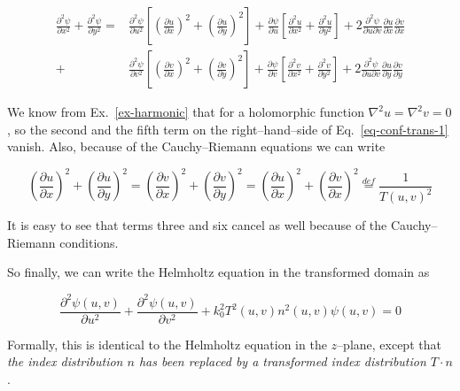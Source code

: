 \begin{sidebar}
\begin{align}
\frac{\partial^2 \psi}{\partial x^2} + \frac{\partial^2 \psi}{\partial y^2}=& 
\frac{\partial^2 \psi}{\partial u^2 }  \left [ \left(\frac{\partial u}{\partial
x}\right)^2 
+ \left(\frac{\partial u}{\partial y}\right)^2\right]+ \frac{\partial
\psi}{\partial u} \left[ \frac{\partial^2 u}{\partial x^2} 
+ \frac{\partial^2 u}{\partial y^2} \right] 
+ 2\frac{\partial^2 \psi}{\partial u \partial v} \frac{\partial u}{\partial x}
\frac{\partial v}{\partial x}    \nonumber \\  
+& \frac{\partial^2 \psi}{\partial v^2}  \left[ \left(\frac{\partial v}{\partial
x}\right)^2  
+ \left(\frac{\partial v}{\partial y}\right)^2\right] + \frac{\partial
\psi}{\partial v} \left[ \frac{\partial^2 v}{\partial x^2} 
+ \frac{\partial^2 v}{\partial y^2} \right]
+ 2\frac{\partial^2 \psi}{\partial u \partial v} \frac{\partial u}{\partial y}
\frac{\partial v}{\partial y}
\label{eq-conf-trans-1}
\end{align} 

We know from Ex.~\ref{ex-harmonic} that for a holomorphic function $\nabla^2 u =
\nabla^2 v=0$, so the second and the fifth term on the right--hand--side of
Eq.~\ref{eq-conf-trans-1} vanish. Also, because of the Cauchy--Riemann equations
we can write

\begin{equation}
\left(\frac{\partial u}{\partial x}\right)^2 + \left(\frac{\partial u}{\partial
y}\right)^2 = \left(\frac{\partial v}{\partial x}\right)^2  +
\left(\frac{\partial v}{\partial y}\right)^2 = 
\left(\frac{\partial u}{\partial x}\right)^2 + \left(\frac{\partial v}{\partial
x}\right)^2 
 \stackrel{def}{=} \frac{1}{T(u,v)^2} \label{eq-T-factor}
\end{equation} 

It is easy to see that terms three and six cancel as well because of the
Cauchy--Riemann conditions.

So finally, we can write the Helmholtz equation in the transformed domain as

\begin{equation}
\frac{\partial^2 \psi(u,v)}{\partial u^2} + \frac{\partial^2 \psi(u,v)}{\partial
v^2} + k_0^2 T^2(u,v)n^2(u,v) \psi(u,v) = 0
\end{equation} 

Formally, this is identical to the Helmholtz equation in the $z$--plane, except
that \emph{the index distribution $n$ has been replaced by a transformed index
distribution $T \cdot n$}.


\end{sidebar}
